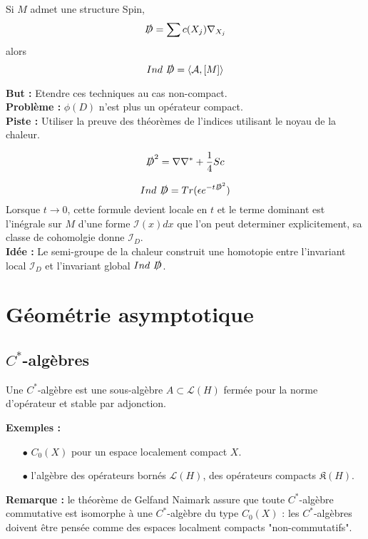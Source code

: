 \documentclass{beamer}
\begin{document}
\begin{frame}
Si $M$ admet une structure Spin,
\[\slashed D = \sum c(X_j) \nabla_{X_j}\]
alors 
\[Ind \ \slashed D= \langle \mathcal A,[M]\rangle\]
\end{frame}

\begin{frame}
\textbf{But :} Etendre ces techniques au cas non-compact.\\

\textbf{Problème :} $\phi(D)$ n'est plus un opérateur compact.\\

\textbf{Piste :} Utiliser la preuve des théorèmes de l'indices utilisant le noyau de la chaleur.\\
\end{frame}

\begin{frame}
\begin{prop}
\[\slashed D^2 =\nabla \nabla^* +\frac{1}{4} Sc \]
\end{prop}

\[Ind \ \slashed D = Tr(\epsilon e^{-t\slashed D^2})\]
Lorsque $t\rightarrow 0$, cette formule devient locale en $t$ et le terme dominant est l'inégrale sur $M$ d'une forme $\mathcal I(x)dx$ que l'on peut determiner explicitement, sa classe de cohomolgie donne $\mathcal I_D$.\\

\textbf{Idée :} Le semi-groupe de la chaleur construit une homotopie entre l'invariant local $\mathcal I_D$ et l'invariant global $Ind \ \slashed D$.  
\end{frame}

\section{Géométrie asymptotique}
\subsection{$C^*$-algèbres}

\begin{frame}
\begin{definition} Une $C^*$-algèbre est une sous-algèbre $A\subset \mathcal L(H)$
 fermée pour la norme d'opérateur et stable par adjonction.
\end{definition}
\textbf{Exemples :} 
\begin{itemize} 
\item[$\bullet$]$C_0(X)$ pour un espace localement compact $X$.
\item[$\bullet$] l'algèbre des opérateurs bornés $\mathcal L(H)$, des opérateurs compacts $\mathfrak K(H)$.
\end{itemize}

\textbf{Remarque :} le théorème de Gelfand Naimark assure que toute $C^*$-algèbre commutative est isomorphe à une $C^*$-algèbre du type $C_0(X)$ : les $C^*$-algèbres doivent être pensée comme des espaces localment compacts "non-commutatifs".
\end{frame}
\end{document}
